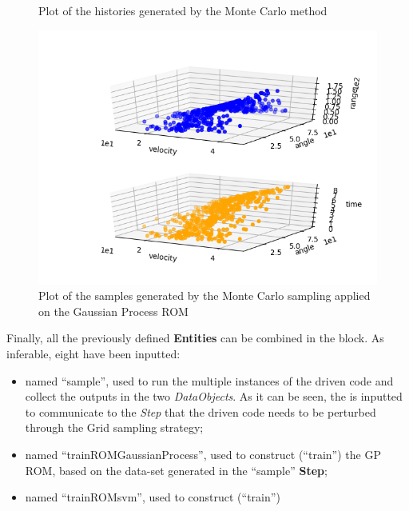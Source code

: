\begin{enumerate}
\begin{figure}[h!]
  \caption{Plot of the histories generated by the Monte Carlo method}
  \label{fig:ROMgrid_histories}
 \end{figure}
 \begin{figure}[h!]
  \centering
  \includegraphics[scale=0.7]{../../tests/framework/user_guide/ReducedOrderModeling/gold/ROMConstruction/1-samplesPlot3DROMgp_scatter-scatter.png}
  \caption{Plot of the samples generated by the Monte Carlo sampling applied on the Gaussian Process ROM}
  \label{fig:ROMgp_samples}
 \end{figure}
   Finally, all the previously defined \textbf{Entities} can be combined in
   the  block. As inferable,
   eight  have been inputted:
   \begin{itemize}
     \item {} named ``sample'', used to run the multiple
     instances of the driven code and
     collect the outputs in the two \textit{DataObjects}. As it can be
     seen, the  is inputted to communicate to the
     \textit{Step} that the driven code needs to
     be perturbed through the Grid sampling strategy;
     \item {} named ``trainROMGaussianProcess'', used to construct (``train'')
     the GP ROM, based on the data-set generated in the  ``sample'' \textbf{Step};
     \item {} named ``trainROMsvm'', used to construct (``train'')

\end{itemize}
\end{enumerate}

